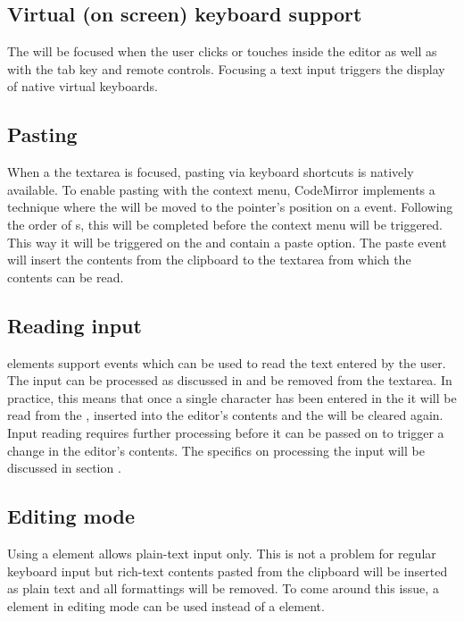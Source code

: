 \subsection{Virtual (on screen) keyboard support} The  will be focused when the user clicks or touches inside the editor as well as with the tab key and remote controls. Focusing a text input triggers the display of native virtual keyboards.

\subsection{Pasting} 
\label{subsec:input_textarea_pasting}

When a the textarea is focused, pasting via keyboard shortcuts is natively available. To enable pasting with the context menu, CodeMirror implements a technique where the  will be moved to the pointer's position on a  event. Following the order of s, this will be completed before the context menu will be triggered. This way it will be triggered on the  and contain a paste option. The paste event will insert the contents from the clipboard to the textarea from which the contents can be read.

\subsection{Reading input}  elements support  events which can be used to read the text entered by the user. The input can be processed as discussed in  and be removed from the textarea. In practice, this means that once a single character has been entered in the  it will be read from the , inserted into the editor's contents and the  will be cleared again. Input reading requires further processing before it can be passed on to trigger a change in the editor's contents. The specifics on processing the input will be discussed in section .

\subsection{Editing mode} Using a  element allows plain-text input only. This is not a problem for regular keyboard input but rich-text contents pasted from the clipboard will be inserted as plain text and all formattings will be removed. To come around this issue, a  element in editing mode can be used instead of a  element.

